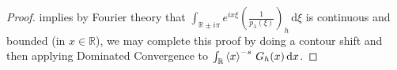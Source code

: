 \documentclass[../dissertation]{subfiles}
\begin{document}
\begin{proof}
	implies by Fourier theory that $\int_{\mathbb R\pm i\pi} e^{ix\xi} 
	\left(\frac{1}{p_\lambda(\xi)}\right)_h \, \mathrm{d}\xi$ is continuous and bounded 
	(in $x \in \mathbb R$), we may complete this proof by doing a contour shift
	and then applying Dominated Convergence to 
	$\int_{\mathbb R} \left\langle x \right\rangle^{-s} \, G_h (x) \, \mathrm{d}x$.
\end{proof}
\end{document}
